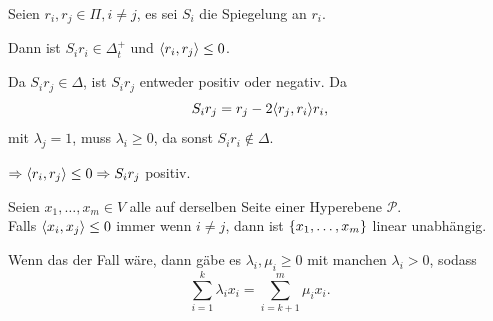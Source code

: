 \documentclass[18pt]{beamer}
\begin{document}
\begin{frame}
    \begin{satz} %
        Seien \( r_i, r_j \in \Pi, i \neq j \), es 
        sei \( S_i \) die Spiegelung an \( r_i \). 

        Dann ist \( S_i r_i \in \Delta_t^+ \) und 
        \( \langle r_i, r_j \rangle \leq 0 \).
    \end{satz}
    \pause
    \begin{bew}
        Da \( S_i r_j \in \Delta \), ist \( S_i r_j \) 
        entweder positiv oder negativ. Da 
        \[ S_i r_j = r_j - 2 \langle r_j, r_i \rangle r_i, \]
        mit \( \lambda_j = 1 \), muss 
        \( \lambda_i \geq 0 \), da sonst 
        \( S_i r_i \notin \Delta \). \pause

        \( \Rightarrow \langle r_i, r_j \rangle \leq 0 
        \Rightarrow S_i r_j \) 
        positiv.
    \end{bew}
\end{frame}

\begin{frame}
    \begin{satz} %
        Seien \( x_1, \ldots, x_m \in V \) alle auf derselben 
        Seite einer Hyperebene \( \mathscr{P} \). \\
        Falls \( \langle x_i, x_j \rangle \leq 0 \) immer wenn 
        \( i \neq j \), dann ist \( \{x_1, \ldots, x_m\} \) 
        linear unabhängig.
    \end{satz} \pause

    \begin{bew}
        Wenn das der Fall wäre, dann gäbe es 
        \( \lambda_i, \mu_i \geq 0 \) mit 
        manchen \( \lambda_i > 0 \), sodass 
        \[ \sum_{i=1}^k \lambda_i x_i 
        = \sum_{i=k+1}^m \mu_i x_i. \]

        \renewcommand{\qedsymbol}{}
    \end{bew}
\end{frame}
\end{document}
